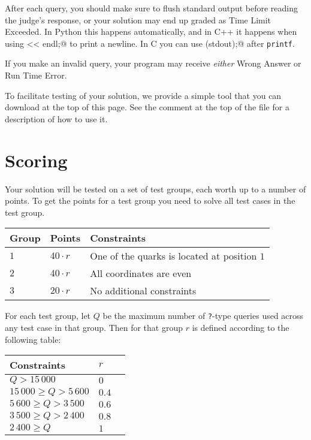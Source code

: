 After each query, you should make sure to flush standard output before reading the judge's response, or your solution may end up graded as Time Limit Exceeded.
In Python this happens automatically, and in C++ it happens when using \verb@cout << endl;@ to print a newline.
In C you can use \verb@fflush(stdout);@ after \texttt{printf}.

If you make an invalid query, your program may receive \emph{either} Wrong Answer or Run Time Error.

To facilitate testing of your solution, we provide a simple tool that you can download at the top of this page.
See the comment at the top of the file for a description of how to use it.

\section*{Scoring}
Your solution will be tested on a set of test groups, each worth up to a number of points.
To get the points for a test group you need to solve all test cases in the test group.

\noindent
\begin{tabular}{| l | l | l |}
  \hline
  Group & Points       & Constraints \\ \hline
  $1$   & $40 \cdot r$ & One of the quarks is located at position $1$ \\ \hline
  $2$   & $40 \cdot r$ & All coordinates are even \\ \hline
  $3$   & $20 \cdot r$ & No additional constraints \\ \hline
\end{tabular}

For each test group, let $Q$ be the maximum number of \texttt{?}-type queries used across any test case in that group.
Then for that group $r$ is defined according to the following table:

\noindent
\begin{tabular}{| l | l | l |}
  \hline
  Constraints                & $r$ \\ \hline
  $             Q > 15\,000$ & $0$ \\ \hline
  $ 15\,000 \ge Q > 5\,600$  & $0.4$  \\ \hline
  $  5\,600 \ge Q > 3\,500$  & $0.6$  \\ \hline
  $  3\,500 \ge Q > 2\,400$  & $0.8$  \\ \hline
  $  2\,400 \ge Q$           & $1$  \\ \hline
\end{tabular}
